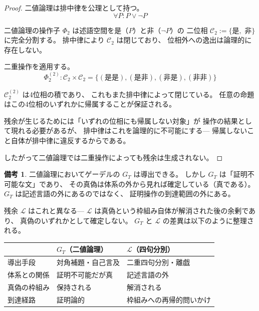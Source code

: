 \documentclass[11pt,a4paper]{article}
\theoremstyle{definition}
\newtheorem{remark}{備考}[section]
\newcommand{\Phitwo}{\Phi_{2}}
\begin{document}
\begin{proof}
二値論理は排中律を公理として持つ。
\begin{equation}
\forall P : P \vee \neg P
\end{equation}

二値論理の操作子 $\Phitwo$ は述語空間を是（$P$）と非（$\neg P$）の
二位相 $\mathcal{C}_2 := \{$是$,$ 非$\}$ に完全分割する。
排中律により $\mathcal{C}_2$ は閉じており、
位相外への逸出は論理的に存在しない。

二重操作を適用する。
\begin{equation}
\Phitwo^{(2)} : \mathcal{C}_2 \times \mathcal{C}_2 = 
\{(\text{是是}), (\text{是非}), (\text{非是}), (\text{非非})\}
\end{equation}

$\mathcal{C}_2^{(2)}$ は4位相の積であり、
これもまた排中律によって閉じている。
任意の命題はこの4位相のいずれかに帰属することが保証される。

残余が生じるためには「いずれの位相にも帰属しない対象」が
操作の結果として現れる必要があるが、
排中律はこれを論理的に不可能にする---
帰属しないこと自体が排中律に違反するからである。

したがって二値論理では二重操作によっても残余は生成されない。
\end{proof}

\begin{remark}
二値論理においてゲーデルの $G_T$ は導出できる。
しかし $G_T$ は「証明不可能な文」であり、
その真偽は体系の外から見れば確定している（真である）。
$G_T$ は記述言語の外にあるのではなく、
証明操作の到達範囲の外にある。

残余 $\mathcal{L}$ はこれと異なる---
$\mathcal{L}$ は真偽という枠組み自体が解消された後の余剰であり、
真偽のいずれかとして確定しない。
$G_T$ と $\mathcal{L}$ の差異は以下のように整理される。
\end{remark}

\begin{center}
\begin{tabular}{lll}
\hline
& $G_T$（二値論理） & $\mathcal{L}$（四句分別） \\
\hline
導出手段 & 対角補題・自己言及 & 二重四句分別・離戯 \\
体系との関係 & 証明不可能だが真 & 記述言語の外 \\
真偽の枠組み & 保持される & 解消される \\
到達経路 & 証明論的 & 枠組みへの再帰的問いかけ \\
\hline
\end{tabular}
\end{center}
\end{document}
